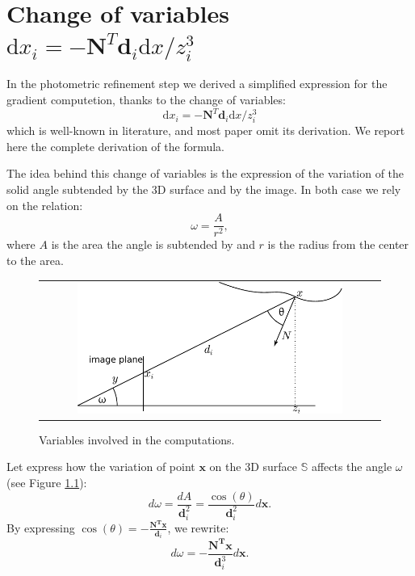  

\chapter[Change of variables \texorpdfstring{\normalfont  $\textrm{d}x_i = -\mathbf{N}^T \mathbf{d}_i \textrm{d}x/z_i^3$}{}]{Change of variables \\ \texorpdfstring{\normalfont $\textrm{d}x_i = -\mathbf{N}^T \mathbf{d}_i \textrm{d}x/z_i^3$}{}}
\label{app:change}

In the photometric refinement step we derived a simplified expression for the gradient computetion, thanks to the change of variables:
\begin{equation}
 \textrm{d}x_i = -\mathbf{N}^T \mathbf{d}_i \textrm{d}x/z_i^3
\end{equation}
which is well-known in literature, and most paper omit its derivation.
We report here the complete derivation of the formula.

The idea behind this change of variables is the expression of the variation of the solid angle subtended by the 3D surface and by the image. 
In both case we rely on the relation:
\begin{equation}
    \omega = \frac{A}{r^2},
\end{equation}
where $A$ is the area the angle is subtended by and $r$ is the radius from the center to the area.


\begin{figure}[bt]
 \centering
 \begin{tabular}{c}
  \includegraphics[width=0.8\textwidth]{./img/ch-appendix/change01}\\
 \end{tabular}
 \caption{Variables involved in the computations.}
 \label{fig:change}
\end{figure}

 
Let express how the variation of point $\mathbf{x}$ on the 3D surface $\mathbb{S}$ affects the angle $\omega$ (see Figure \ref{fig:change}):
\begin{equation}
    d\omega = \frac{dA}{\mathbf{d}_i^2} = \frac{\cos(\theta)}{\mathbf{d}_i^2}d\mathbf{x}.
\end{equation}
By expressing $\cos(\theta) = -\frac{\mathbf{N^T x}}{\mathbf{d}_i}$,  we rewrite:
\begin{equation}
\label{eq:change1}
    d\omega  = -\frac{\mathbf{N^T x}}{\mathbf{d}_i^3}d\mathbf{x}.
\end{equation}

